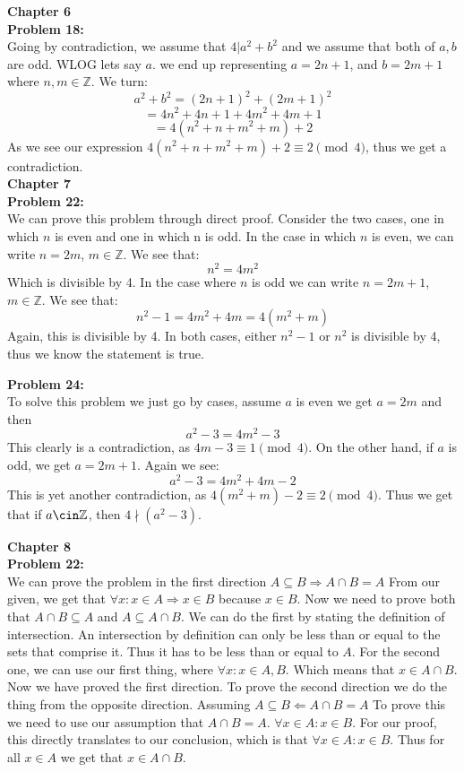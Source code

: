\documentclass[12pt]{article}
\begin{document}
\noindent
\textbf{Chapter 6}\\


\noindent
\textbf{Problem 18:}\\

Going by contradiction, we assume that $4|a^2 + b^2$ and we assume that both of $a, b$ are odd. WLOG lets say $a$. 
we end up representing $a = 2n+1$, and $b = 2m+1$ where $n, m \in \mathbb{Z}$. We turn: \\
$$a^2 + b^2 = (2n+1)^2 + (2m+1)^2$$
$$= 4n^2+4n+1 + 4m^2+4m+1$$
$$= 4(n^2 + n + m^2 + m) + 2$$
As we see our expression $4(n^2 + n + m^2 + m) + 2 \equiv 2 \pmod 4$, thus we get a contradiction.\\

\noindent 
\textbf{Chapter 7}\\

\noindent
\textbf{Problem 22:}\\

We can prove this problem through direct proof. Consider the two cases, one in which $n$ is even and one in which n is odd.
In the case in which $n$ is even, we can write $n = 2m$, $m \in \mathbb{Z}$. We see that: 
$$n^2 = 4m^2$$
Which is divisible by 4.
In the case where $n$ is odd we can write $n = 2m+1$, $m \in \mathbb{Z}$. We see that:
$$n^2 - 1 = 4m^2 + 4m = 4(m^2 + m)$$
Again, this is divisible by 4. In both cases, either $n^2-1$ or $n^2$ is divisible by 4, thus we know the statement is true.

\noindent 
\textbf{Problem 24: }\\

To solve this problem we just go by cases, assume $a$ is even we get $a = 2m$ and then 
$$a^2-3 = 4m^2 -3$$
This clearly is a contradiction, as $4m-3 \equiv 1 \pmod 4$.
On the other hand, if $a$ is odd, we get $a = 2m+1$. Again we see:
$$a^2-3 = 4m^2 + 4m - 2$$
This is yet another contradiction, as $4(m^2 + m) - 2 \equiv 2 \pmod 4$. Thus we get that if 
$a \cin \mathbb{Z}$, then $4 \nmid (a^2-3)$.

\noindent 
\textbf{Chapter 8}\\

\noindent
\textbf{Problem 22:}\\

We can prove the problem in the first direction $A \subseteq B \Rightarrow A \cap B = A$
From our given, we get that $\forall x: x \in A \Rightarrow x \in B$ because $x \in B$.
Now we need to prove both that $A \cap B \subseteq A$ and $A \subseteq A \cap B$.
We can do the first by stating the definition of intersection. An intersection by definition
can only be less than or equal to the sets that comprise it. Thus it has to be less than or equal to $A$.
For the second one, we can use our first thing, where $\forall x: x \in A, B$. Which means that 
$x \in A \cap B$. Now we have proved the first direction.
To prove the second direction we do the thing from the opposite direction. Assuming
$A \subseteq B \Leftarrow A \cap B = A$ 
To prove this we need to use our assumption that $A \cap B = A$. $\forall x \in A : x \in B$.
For our proof, this directly translates to our conclusion, which is that $\forall x \in A : x \in B$.
Thus for all $x \in A$ we get that $x \in A \cap B$.\\
\end{document}
